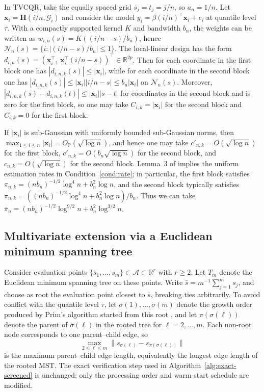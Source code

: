 \documentclass[lineno]{biometrika}
\begin{document}
In TVCQR, take the equally spaced grid $s_j=t_j=j/n$, so $a_n=1/n$. Let
$\mathbf x_i=\mathbf H(i/n,\mathcal G_i)$ and consider the model $y_i=\beta(i/n)^\top\mathbf x_i+e_i$ at quantile
level $\tau$. With a compactly supported kernel $K$ and bandwidth $b_n$, the weights can be written as
$w_{i,n}(s)=K((i/n-s)/b_n)$, hence $\mathcal N_n(s)=\{i:|(i/n-s)/b_n|\le 1\}$. The local-linear design has the form
$d_{i,n}(s)=(\mathbf x_i^\top,\ \mathbf x_i^\top(i/n-s))^\top\in\mathbb R^{2p}$. Then for each coordinate in the first
block one has $|d_{i,n,k}(s)|\le |\mathbf x_i|$, while for each coordinate in the second block one has
$|d_{i,n,k}(s)|\le |\mathbf x_i||i/n-s|\le b_n|\mathbf x_i|$ on $\mathcal N_n(s)$. Moreover,
$|d_{i,n,k}(s)-d_{i,n,k}(t)|\le |\mathbf x_i||s-t|$ for coordinates in the second block and is zero for the first
block, so one may take $C_{i,k}= |\mathbf x_i|$ for the second block and $C_{i,k}=0$ for the first block.

If $|\mathbf x_i|$ is sub-Gaussian with uniformly bounded sub-Gaussian norms, then
$\max_{1\le i\le n}|\mathbf x_i|=O_{\mathbb P}(\sqrt{\log n})$, and hence one may take
$c'_{n,k}=O(\sqrt{\log n})$ for the first block, $c'_{n,k}=O(b_n\sqrt{\log n})$ for the second block, and
$c_{n,k}=O(\sqrt{\log n})$ for the second block. Lemma~3 of \cite{wu2017nonparametric} implies the uniform estimation
rates in Condition~\ref{cond:rate}; in particular, the first block satisfies
$\pi_{n,k}= (n b_n)^{-1/2}\log^4 n+b_n^2\log n$, and the second block typically satisfies
$\pi_{n,k}= ((n b_n)^{-1/2}\log^4 n+b_n^2\log n)/b_n$. Thus we can take
$\bar\pi_n=(nb_n)^{-1/2}\log^{9/2}n+b_n^2\log^{3/2}n$.

\subsection{Multivariate extension via a Euclidean minimum spanning tree}\label{app:mst}

Consider evaluation points $\{s_1,\ldots,s_m\}\subset \mathcal A\subset \mathbb R^r$ with $r\ge 2$. Let $T_m$ denote
the Euclidean minimum spanning tree on these points. Write $\bar s=m^{-1}\sum_{j=1}^m s_j$, and choose as root the
evaluation point closest to $\bar s$, breaking ties arbitrarily. To avoid conflict with the quantile level $\tau$, let
$\sigma(1),\ldots,\sigma(m)$ denote the growth order produced by Prim's algorithm started from this root
\cite{Prim1957}, and let $\pi(\sigma(\ell))$ denote the parent of $\sigma(\ell)$ in the rooted tree for
$\ell=2,\ldots,m$. Each non-root node corresponds to one parent--child edge, so
\[
\max_{2\le \ell\le m}\|s_{\sigma(\ell)}-s_{\pi(\sigma(\ell))}\|
\]
is the maximum parent--child edge length, equivalently the longest edge length of the rooted MST. The exact
verification step used in Algorithm~\ref{alg:exact-screened} is unchanged; only the processing order and warm-start
schedule are modified.
\end{document}
